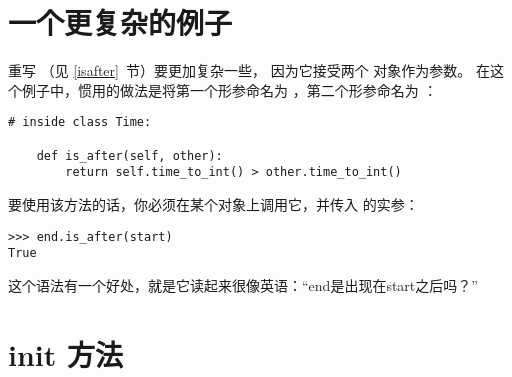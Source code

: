 \section{一个更复杂的例子}


重写  （见 \ref{isafter}~节）要更加复杂一些，
因为它接受两个  对象作为参数。  
在这个例子中，惯用的做法是将第一个形参命名为 ，第二个形参命名为 ：

\begin{lstlisting}
# inside class Time:

    def is_after(self, other):
        return self.time_to_int() > other.time_to_int()
\end{lstlisting}

%

要使用该方法的话，你必须在某个对象上调用它，并传入  的实参：

\begin{lstlisting}
>>> end.is_after(start)
True
\end{lstlisting}

%

这个语法有一个好处，就是它读起来很像英语：``end是出现在start之后吗？''

\section{init 方法}
  


